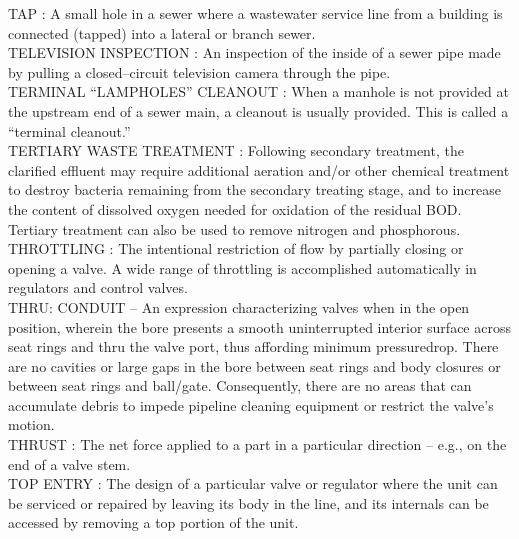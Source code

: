 \vspace{0.15cm}
TAP :  A small hole in a sewer where a wastewater service line from a building is connected (tapped) into a lateral or branch sewer. \\
\vspace{0.15cm}
TELEVISION INSPECTION :  An inspection of the inside of a sewer pipe made by pulling a closed–circuit television camera through the pipe. \\
\vspace{0.15cm}
TERMINAL “LAMPHOLES” CLEANOUT :  When a manhole is not provided at the upstream end of a sewer main, a cleanout is usually provided. This is called a “terminal cleanout.” \\
\vspace{0.15cm}
TERTIARY WASTE TREATMENT :   Following secondary treatment, the clarified effluent may require additional aeration and/or other chemical treatment to destroy bacteria remaining from the secondary treating stage, and to increase the content of dissolved oxygen needed for oxidation of the residual BOD. Tertiary treatment can also be used to remove nitrogen and phosphorous.\\
\vspace{0.15cm}
THROTTLING :   The intentional restriction of flow by partially closing or opening a valve. A wide range of throttling is accomplished automatically in regulators and control valves.\\
\vspace{0.15cm}
THRU: CONDUIT –  An expression characterizing valves when in the open position, wherein the bore presents a smooth uninterrupted interior surface across seat rings and thru the valve port, thus affording minimum pressuredrop. There are no cavities or large gaps in the bore between seat rings and body closures or between seat rings and ball/gate. Consequently, there are no areas that can accumulate debris to impede pipeline cleaning equipment or restrict the valve's motion.\\
\vspace{0.15cm}
THRUST :   The net force applied to a part in a particular direction – e.g., on the end of a valve stem.\\
\vspace{0.15cm}
TOP ENTRY :   The design of a particular valve or regulator where the unit can be serviced or repaired by leaving its body in the line, and its internals can be accessed by removing a top portion of the unit.\\
\vspace{0.15cm}
